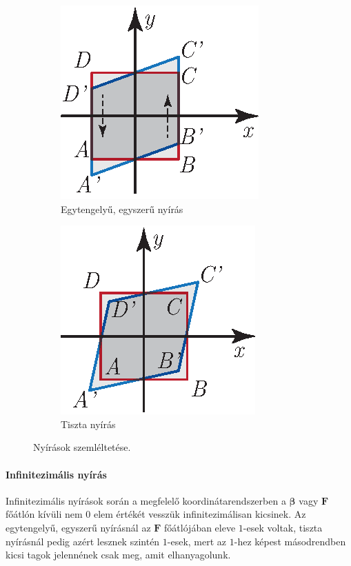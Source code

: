 \documentclass[12pt,a4paper]{scrartcl}
\let\mathbf\bm
\begin{document}
\begin{figure}[htb] 
\begin{subfigure}[b]{0.45\textwidth}
\centering
\includegraphics[scale=1]{figs/nyiras.eps}
\caption{Egytengelyű, egyszerű nyírás}
\label{fig:nyiras}
\end{subfigure} \hfill
\begin{subfigure}[b]{0.45\textwidth}
\centering
\includegraphics[scale=1]{figs/tiszta_nyiras.eps}
\caption{Tiszta nyírás}
\label{fig:tiszta_nyiras}
\end{subfigure}
\label{fig_nyujtasok}
\caption{Nyírások szemléltetése.}
\end{figure}


\paragraph{Infinitezimális nyírás}
Infinitezimális nyírások során a megfelelő koordinátarendszerben a ${\mathbf{\beta }}$ vagy ${\mathbf{F}}$ főátlón kívüli nem $0$ elem értékét vesszük infinitezimálisan kicsinek. Az egytengelyű, egyszerű nyírásnál az ${\mathbf{F}}$ főátlójában eleve $1$-esek voltak, tiszta nyírásnál pedig azért lesznek szintén $1$-esek, mert az $1$-hez képest másodrendben kicsi tagok jelennének csak meg, amit elhanyagolunk.
\end{document}
